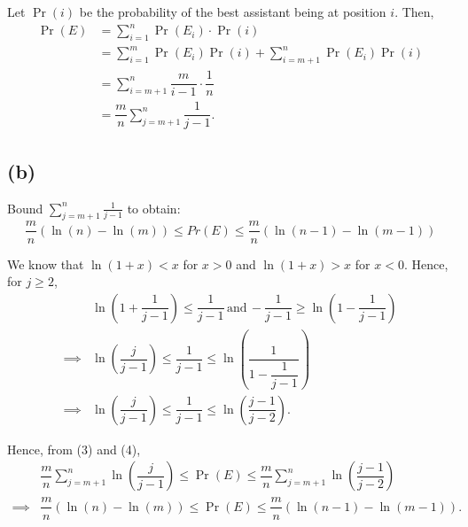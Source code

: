 \documentclass{article}
\begin{document}
Let $\Pr(i)$ be the probability of the best assistant being at position $i$. Then,
\begin{equation}
    \begin{aligned}
        \Pr(E) &= \sum_{i=1}^{n}\Pr(E_i)\cdot \Pr(i) \\
        &= {\sum_{i=1}^{m}\Pr(E_i)\Pr(i)} + {\sum_{i=m+1}^{n}\Pr(E_i)\Pr(i)} \\
        &= \sum_{i=m+1}^{n}\dfrac{m}{i-1}\cdot \dfrac{1}{n} \\
        &= \dfrac{m}{n}\sum_{j=m+1}^{n}\dfrac{1}{j-1}.
    \end{aligned}
\end{equation}

\subsection*{(b)}

\begin{tcolorbox}
    Bound $\sum_{j=m+1}^n \frac{1}{j-1}$ to obtain:
    \begin{equation*}
        \dfrac{m}{n}(\ln(n) - \ln(m)) \le Pr(E) \le \dfrac{m}{n}(\ln(n - 1) - \ln(m - 1))
    \end{equation*}
\end{tcolorbox}

We know that $\ln(1+x)<x$ for $x > 0$ and $\ln(1+x)>x$ for $x < 0$. Hence, for $j\ge 2$,
\begin{equation}
    \begin{aligned}
        &\ln\left(1+\dfrac{1}{j-1}\right) \le \dfrac{1}{j-1}\, \text{and}\, -\dfrac{1}{j-1} \ge \ln\left(1-\dfrac{1}{j-1}\right) \\
        \implies & \ln\left(\dfrac{j}{j-1}\right) \le \dfrac{1}{j-1} \le \ln\left(\dfrac{1}{1-\dfrac{1}{j-1}}\right) \\
        \implies & \ln\left(\dfrac{j}{j-1}\right) \le \dfrac{1}{j-1} \le \ln\left(\dfrac{j-1}{j-2}\right).
    \end{aligned}
\end{equation}

Hence, from (3) and (4),
\begin{equation}
    \begin{aligned}
        & \dfrac{m}{n}\sum_{j=m+1}^{n}\ln\left(\dfrac{j}{j-1}\right) \le \Pr(E) \le \dfrac{m}{n}\sum_{j=m+1}^{n}\ln\left(\dfrac{j-1}{j-2}\right) \\
        \implies & \dfrac{m}{n}(\ln(n)-\ln(m)) \le \Pr(E) \le \dfrac{m}{n}(\ln(n-1)-\ln(m-1)).
    \end{aligned}
\end{equation}
\end{document}
